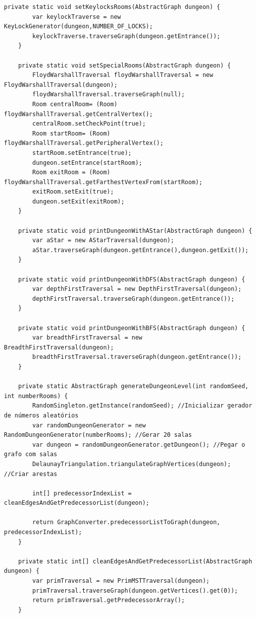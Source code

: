 \documentclass[a4paper, 12pt]{article}
\begin{document}
\begin{verbatim}
private static void setKeylocksRooms(AbstractGraph dungeon) {
        var keylockTraverse = new KeyLockGenerator(dungeon,NUMBER_OF_LOCKS);
        keylockTraverse.traverseGraph(dungeon.getEntrance());
    }

    private static void setSpecialRooms(AbstractGraph dungeon) {
        FloydWarshallTraversal floydWarshallTraversal = new FloydWarshallTraversal(dungeon);
        floydWarshallTraversal.traverseGraph(null);
        Room centralRoom= (Room) floydWarshallTraversal.getCentralVertex();
        centralRoom.setCheckPoint(true);
        Room startRoom= (Room) floydWarshallTraversal.getPeripheralVertex();
        startRoom.setEntrance(true);
        dungeon.setEntrance(startRoom);
        Room exitRoom = (Room) floydWarshallTraversal.getFarthestVertexFrom(startRoom);
        exitRoom.setExit(true);
        dungeon.setExit(exitRoom);
    }

    private static void printDungeonWithAStar(AbstractGraph dungeon) {
        var aStar = new AStarTraversal(dungeon);
        aStar.traverseGraph(dungeon.getEntrance(),dungeon.getExit());
    }

    private static void printDungeonWithDFS(AbstractGraph dungeon) {
        var depthFirstTraversal = new DepthFirstTraversal(dungeon);
        depthFirstTraversal.traverseGraph(dungeon.getEntrance());
    }

    private static void printDungeonWithBFS(AbstractGraph dungeon) {
        var breadthFirstTraversal = new BreadthFirstTraversal(dungeon);
        breadthFirstTraversal.traverseGraph(dungeon.getEntrance());
    }

    private static AbstractGraph generateDungeonLevel(int randomSeed, int numberRooms) {
        RandomSingleton.getInstance(randomSeed); //Inicializar gerador de números aleatórios
        var randomDungeonGenerator = new RandomDungeonGenerator(numberRooms); //Gerar 20 salas
        var dungeon = randomDungeonGenerator.getDungeon(); //Pegar o grafo com salas
        DelaunayTriangulation.triangulateGraphVertices(dungeon); //Criar arestas

        int[] predecessorIndexList = cleanEdgesAndGetPredecessorList(dungeon);

        return GraphConverter.predecessorListToGraph(dungeon, predecessorIndexList);
    }

    private static int[] cleanEdgesAndGetPredecessorList(AbstractGraph dungeon) {
        var primTraversal = new PrimMSTTraversal(dungeon);
        primTraversal.traverseGraph(dungeon.getVertices().get(0));
        return primTraversal.getPredecessorArray();
    }
\end{verbatim}
\end{document}
